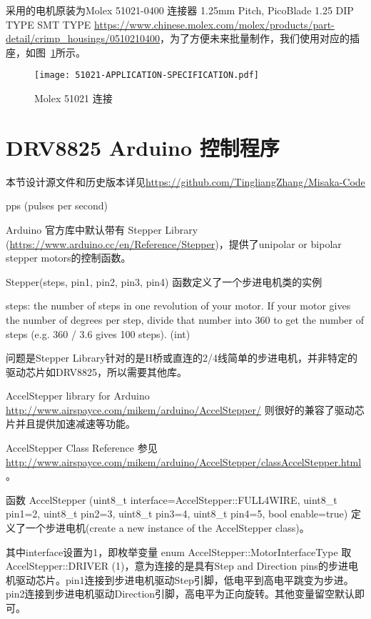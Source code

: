 采用的电机原装为Molex 51021-0400 连接器 1.25mm Pitch, PicoBlade 1.25 DIP TYPE SMT TYPE \url{https://www.chinese.molex.com/molex/products/part-detail/crimp_housings/0510210400}，为了方便未来批量制作，我们使用对应的插座，如图~\ref{fig:51021-APPLICATION-SPECIFICATION}所示。

\begin{figure}[htbp]
    \centering
    \texttt{[image: 51021-APPLICATION-SPECIFICATION.pdf]}
    \caption{Molex 51021 连接}
    \label{fig:51021-APPLICATION-SPECIFICATION}
\end{figure}


\section{DRV8825 Arduino 控制程序}

本节设计源文件和历史版本详见\url{https://github.com/TingliangZhang/Misaka-Code}

pps (pulses per second)

Arduino 官方库中默认带有 Stepper Library (\url{https://www.arduino.cc/en/Reference/Stepper})，提供了unipolar or bipolar stepper motors的控制函数。

Stepper(steps, pin1, pin2, pin3, pin4) 函数定义了一个步进电机类的实例

steps: the number of steps in one revolution of your motor. If your motor gives the number of degrees per step, divide that number into 360 to get the number of steps (e.g. 360 / 3.6 gives 100 steps). (int)

问题是Stepper Library针对的是H桥或直连的2/4线简单的步进电机，并非特定的驱动芯片如DRV8825，所以需要其他库。

AccelStepper library for Arduino \url{http://www.airspayce.com/mikem/arduino/AccelStepper/} 则很好的兼容了驱动芯片并且提供加速减速等功能。

AccelStepper Class Reference 参见 \url{http://www.airspayce.com/mikem/arduino/AccelStepper/classAccelStepper.html} 。

函数 AccelStepper (uint8\_t interface=AccelStepper::FULL4WIRE, uint8\_t pin1=2, uint8\_t pin2=3, uint8\_t pin3=4, uint8\_t pin4=5, bool enable=true) 定义了一个步进电机(create a new instance of the AccelStepper class)。

其中interface设置为1，即枚举变量 enum AccelStepper::MotorInterfaceType 取AccelStepper::DRIVER (1)，意为连接的是具有Step and Direction pins的步进电机驱动芯片。pin1连接到步进电机驱动Step引脚，低电平到高电平跳变为步进。pin2连接到步进电机驱动Direction引脚，高电平为正向旋转。其他变量留空默认即可。

